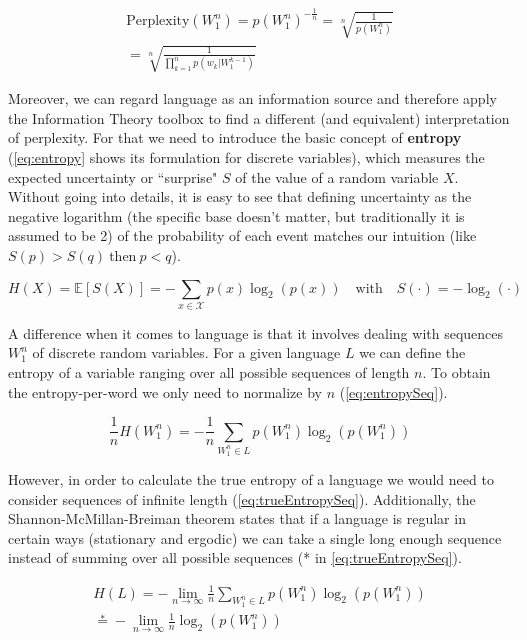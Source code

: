 \begin{equation} \label{eq:pp}
	\begin{gathered}
		\text{Perplexity}(W_1^n) = p(W_1^n)^{-\frac{1}{n}} = \sqrt[n]{\frac{1}{p(W_1^n)}} \\
		= \sqrt[n]{\frac{1}{\prod_{k=1}^{n} p(w_k|W_{1}^{k-1})}}
	\end{gathered}
\end{equation}

Moreover, we can regard language as an information source and therefore apply the Information Theory toolbox to find a different (and equivalent) interpretation of perplexity. For that we need to introduce the basic concept of \textbf{entropy} (\autoref{eq:entropy} shows its formulation for discrete variables), which measures the expected uncertainty or ``surprise" $S$ of the value of a random variable $X$. Without going into details, it is easy to see that defining uncertainty as the negative logarithm (the specific base doesn't matter, but traditionally it is assumed to be 2) of the probability of each event matches our intuition (like $S(p)>S(q) \ \text{then} \ p<q$).

\begin{equation} \label{eq:entropy}
	H(X)=\mathbb{E}[S(X)]=-\sum_{x \in \mathcal{X}}p(x)\log_2(p(x)) \quad \text{with} \quad S(\cdot)=-\log_2(\cdot)
\end{equation}

A difference when it comes to language is that it involves dealing with sequences $W_1^n$ of discrete random variables. For a given language $L$ we can define the entropy of a variable ranging over all possible sequences of length $n$. To obtain the entropy-per-word we only need to normalize by $n$ (\autoref{eq:entropySeq}).

\begin{equation} \label{eq:entropySeq}
	\frac{1}{n} H(W_1^n) = -\frac{1}{n}\sum_{W_1^n \in L}p(W_1^n)\log_2(p(W_1^n))
\end{equation}

However, in order to calculate the true entropy of a language we would need to consider sequences of infinite length (\autoref{eq:trueEntropySeq}). Additionally, the Shannon-McMillan-Breiman theorem states that if a language is regular in certain ways (stationary and ergodic) we can take a single long enough sequence instead of summing over all possible sequences (* in \autoref{eq:trueEntropySeq}).

\begin{equation} \label{eq:trueEntropySeq}
	\begin{gathered}
		H(L) = -\lim\limits_{n \rightarrow \infty}\frac{1}{n}\sum_{W_1^n \in L}p(W_1^n)\log_2(p(W_1^n))\\
		\stackrel{*}{=} -\lim\limits_{n \rightarrow \infty}\frac{1}{n}\log_2(p(W_1^n))
	\end{gathered}
\end{equation}


